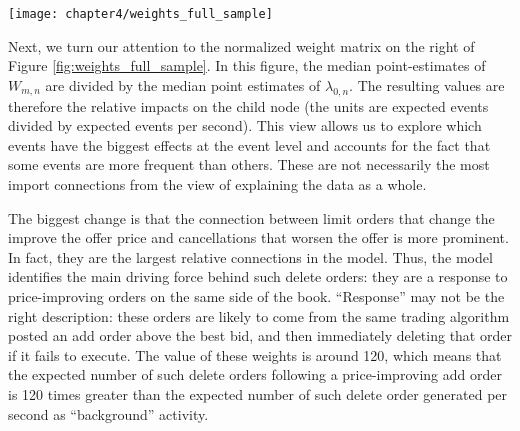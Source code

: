 		\begin{sidewaysfigure}[p]
			\small
			\linespread{1}
			\centering
			\texttt{[image: chapter4/weights\_full\_sample]}
			\captionsetup{skip=-20pt, position=below, font=footnotesize, justification=justified, width=\linewidth}
			\caption[Median of event connection point-estimates: full sample]{Median of event connection point-estimates: full sample. The figure shows the median connection strength between event types across the full sample of stocks. Larger values indicate stronger connections, which are expected to generate a greater number of child events. (Left) The median of connection weight estimates using the raw weight matrix estimates. This figure identifies the most important connections in an absolute sense. (Right) The median connection weight matrix after normalizing parent-child weights by the estimated background rate of child events. This figure identifies the most important connections in a relative sense.}
			\label{fig:weights_full_sample}
		\end{sidewaysfigure}

		Next, we turn our attention to the normalized weight matrix on the right of Figure \ref{fig:weights_full_sample}. In this figure, the median point-estimates of $W_{m,n}$ are divided by the median point estimates of $\lambda_{0,n}$. The resulting values are therefore the relative impacts on the child node (the units are expected events divided by expected events per second). This view allows us to explore which events have the biggest effects at the event level and accounts for the fact that some events are more frequent than others. These are not necessarily the most import connections from the view of explaining the data as a whole.

		The biggest change is that the connection between limit orders that change the improve the offer price and cancellations that worsen the offer is more prominent. In fact, they are the largest relative connections in the model. Thus, the model identifies the main driving force behind such delete orders: they are a response to price-improving orders on the same side of the book. “Response” may not be the right description: these orders are likely to come from the same trading algorithm posted an add order above the best bid, and then immediately deleting that order if it fails to execute. The value of these weights is around 120, which means that the expected number of such delete orders following a price-improving add order is 120 times greater than the expected number of such delete order generated per second as “background” activity.

